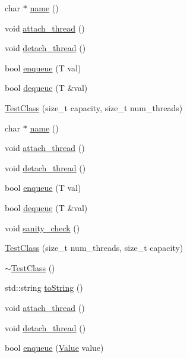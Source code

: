 \begin{DoxyCompactItemize}
\item 
char $\ast$ \hyperlink{class_test_class_a1bd0edf8d0e906d97e4b3c768398cf7b}{name} ()
\item 
void \hyperlink{class_test_class_a7e6bce4c39c047282ea8c1f1485a260b}{attach\+\_\+thread} ()
\item 
void \hyperlink{class_test_class_a79b3a395c8a1fac7a156228a27d829cc}{detach\+\_\+thread} ()
\item 
bool \hyperlink{class_test_class_a2b4f6df9453394ab73885f875801659d}{enqueue} (T val)
\item 
bool \hyperlink{class_test_class_a781dcd2216461c876843923c11bb9aac}{dequeue} (T \&val)
\item 
\hyperlink{class_test_class_a2caeb43f7bbe5512fac0d4c58f1c2263}{Test\+Class} (size\+\_\+t capacity, size\+\_\+t num\+\_\+threads)
\item 
char $\ast$ \hyperlink{class_test_class_a1bd0edf8d0e906d97e4b3c768398cf7b}{name} ()
\item 
void \hyperlink{class_test_class_a7e6bce4c39c047282ea8c1f1485a260b}{attach\+\_\+thread} ()
\item 
void \hyperlink{class_test_class_a79b3a395c8a1fac7a156228a27d829cc}{detach\+\_\+thread} ()
\item 
bool \hyperlink{class_test_class_a2b4f6df9453394ab73885f875801659d}{enqueue} (T val)
\item 
bool \hyperlink{class_test_class_a781dcd2216461c876843923c11bb9aac}{dequeue} (T \&val)
\item 
void \hyperlink{class_test_class_a72a094bae5f780bb6fae94aaf43f9773}{sanity\+\_\+check} ()
\item 
\hyperlink{class_test_class_ab3dbc7a67da46dda1125f7dee533aca2}{Test\+Class} (size\+\_\+t num\+\_\+threads, size\+\_\+t capacity)
\item 
\hyperlink{class_test_class_a2466c51dad9d120019f486d8372d2a2e}{$\sim$\+Test\+Class} ()
\item 
std\+::string \hyperlink{class_test_class_a84e73a91ede625887472a307235d6de5}{to\+String} ()
\item 
void \hyperlink{class_test_class_a7e6bce4c39c047282ea8c1f1485a260b}{attach\+\_\+thread} ()
\item 
void \hyperlink{class_test_class_a79b3a395c8a1fac7a156228a27d829cc}{detach\+\_\+thread} ()
\item 
bool \hyperlink{class_test_class_a48ec6b0f960a62ad6073b1df391932ef}{enqueue} (\hyperlink{hash__map_2test_object_8h_ad777bf08d8e2b01df17ba5e3c51ae11f}{Value} value)
\item 

\end{DoxyCompactItemize}
